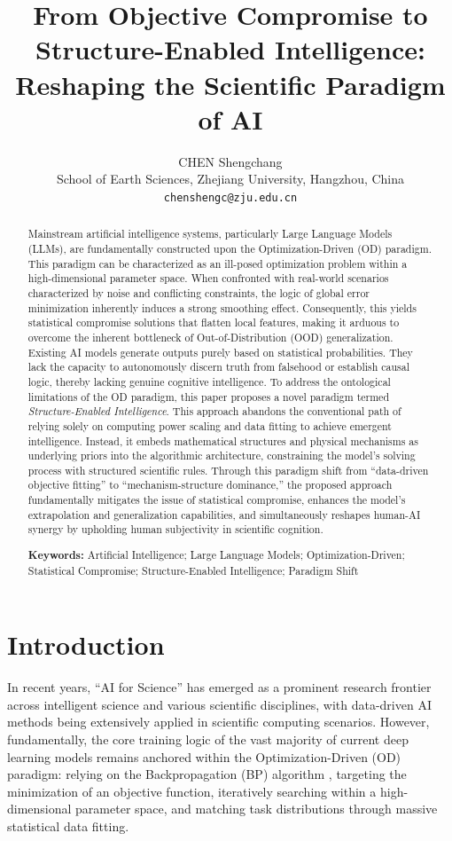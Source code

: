 \documentclass[11pt,a4paper]{article}
\title{\textbf{From Objective Compromise to Structure-Enabled Intelligence: Reshaping the Scientific Paradigm of AI}}
\author{
    CHEN Shengchang \\
    School of Earth Sciences, Zhejiang University, Hangzhou, China \\
    \texttt{chenshengc@zju.edu.cn}
}
\date{}
\begin{document}
\maketitle

\begin{abstract}
Mainstream artificial intelligence systems, particularly Large Language Models (LLMs), are fundamentally constructed upon the Optimization-Driven (OD) paradigm. This paradigm can be characterized as an ill-posed optimization problem within a high-dimensional parameter space. When confronted with real-world scenarios characterized by noise and conflicting constraints, the logic of global error minimization inherently induces a strong smoothing effect. Consequently, this yields statistical compromise solutions that flatten local features, making it arduous to overcome the inherent bottleneck of Out-of-Distribution (OOD) generalization. Existing AI models generate outputs purely based on statistical probabilities. They lack the capacity to autonomously discern truth from falsehood or establish causal logic, thereby lacking genuine cognitive intelligence. To address the ontological limitations of the OD paradigm, this paper proposes a novel paradigm termed \textit{Structure-Enabled Intelligence}. This approach abandons the conventional path of relying solely on computing power scaling and data fitting to achieve emergent intelligence. Instead, it embeds mathematical structures and physical mechanisms as underlying priors into the algorithmic architecture, constraining the model's solving process with structured scientific rules. Through this paradigm shift from ``data-driven objective fitting'' to ``mechanism-structure dominance,'' the proposed approach fundamentally mitigates the issue of statistical compromise, enhances the model's extrapolation and generalization capabilities, and simultaneously reshapes human-AI synergy by upholding human subjectivity in scientific cognition.

\vspace{1em}
\noindent \textbf{Keywords:} Artificial Intelligence; Large Language Models; Optimization-Driven; Statistical Compromise; Structure-Enabled Intelligence; Paradigm Shift
\end{abstract}

\section{Introduction}
In recent years, ``AI for Science'' has emerged as a prominent research frontier across intelligent science and various scientific disciplines, with data-driven AI methods being extensively applied in scientific computing scenarios. However, fundamentally, the core training logic of the vast majority of current deep learning models remains anchored within the Optimization-Driven (OD) paradigm: relying on the Backpropagation (BP) algorithm \cite{rumelhart1986}, targeting the minimization of an objective function, iteratively searching within a high-dimensional parameter space, and matching task distributions through massive statistical data fitting.
\end{document}
